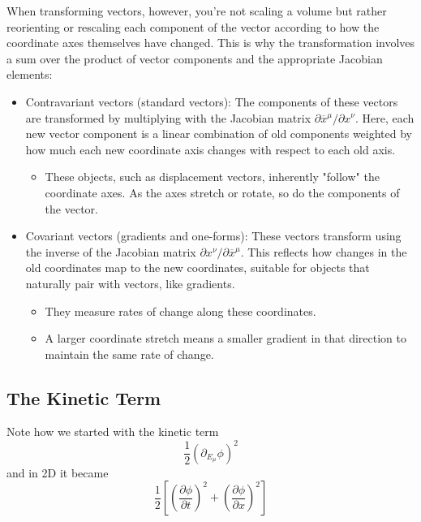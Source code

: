 When transforming vectors, however, you're not scaling a volume but rather reorienting or rescaling each component
of the vector according to how the coordinate axes themselves have changed.
This is why the transformation involves a sum over the product of vector components and the appropriate Jacobian elements:

\begin{itemize}
\item Contravariant vectors (standard vectors): The components of these vectors are transformed by multiplying with the
    Jacobian matrix $\partial \overline{x}^\mu / \partial x^\nu$. Here, each new vector component is a linear combination
    of old components weighted by how much each new coordinate axis changes with respect to each old axis.
    \begin{itemize}
        \item These objects, such as displacement vectors, inherently "follow" the coordinate axes. As the axes stretch
        or rotate, so do the components of the vector. 
    \end{itemize}
\item Covariant vectors (gradients and one-forms): These vectors transform using the inverse of the Jacobian matrix
    $\partial x^\nu / \partial \overline{x}^\mu$. This reflects how changes in the old coordinates map to the new
    coordinates, suitable for objects that naturally pair with vectors, like gradients.
    \begin{itemize}
        \item They measure rates of change along these coordinates.
        \item A larger coordinate stretch means a smaller gradient in that direction to maintain the same rate of change.
    \end{itemize}
\end{itemize}





\subsection{The Kinetic Term}

Note how we started with the kinetic term
$$
\frac{1}{2} \left( \partial_{E_\mu} \phi \right)^2
$$
and in 2D it became
$$
\frac{1}{2} \left[ 
    \left( \frac{\partial \phi}{\partial t} \right)^2 +  \left( \frac{\partial \phi}{\partial x} \right)^2
\right]
$$

